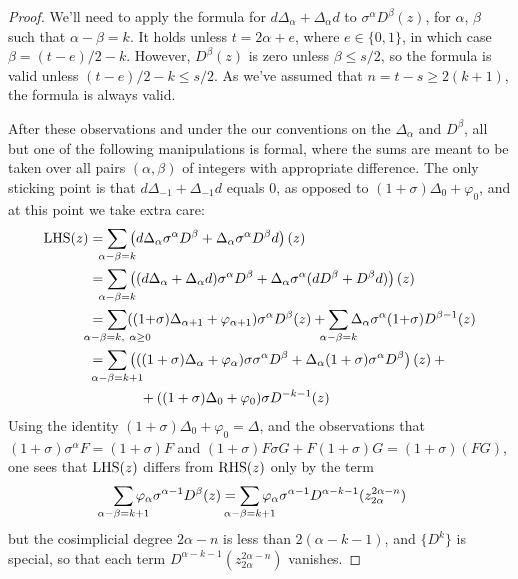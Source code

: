 \documentclass[11pt]{amsart}
\theoremstyle{plain}
\theoremstyle{definition}
\let\phi\varphi
\newcommand{\twist}{\sigma}
\theoremstyle{plain}
\begin{document}
\begin{proof}
\newcommand{\twolinesum}[2]{\mathop{\sum_{\mathclap{#1}}}_{\mathclap{#2}}}
\newcommand{\onelinesum}[1]{\sum_{\mathclap{#1}}}
We'll need to apply the formula for $d\Delta_\alpha+\Delta_\alpha d$ to $\twist^\alpha D^\beta(z)$, for $\alpha$, $\beta$ such that $\alpha-\beta=k$. %
It holds unless $t=2\alpha+e$, where $e\in\{0,1\}$, in which case $\beta=(t-e)/2-k$. However, $D^\beta(z)$ is zero unless $\beta\leq s/2$, so the formula is valid unless $(t-e)/2-k\leq s/2$. As we've assumed that $n=t-s\geq2(k+1)$, the formula is always valid.

After these observations and under the our conventions on the $\Delta_\alpha$ and $D^\beta$, all but one of the following manipulations is formal, where the sums are meant to be taken over all pairs $(\alpha,\beta)$ of integers with appropriate difference. The only sticking point is that $d\Delta_{-1}+\Delta_{-1}d$ equals $0$, as opposed to $(1{+}\twist)\Delta_0+\phi_0$, and at this point we take extra care:
%
\begin{alignat*}{2}
\textup{LHS}(z)
&=
\onelinesum{\alpha-\beta=k}\left(d\Delta_\alpha\twist^\alpha D^\beta+\Delta_\alpha\twist^\alpha D^\beta d\right)(z)%
\\
&=
\onelinesum{\alpha-\beta=k}\left((d\Delta_\alpha+
\Delta_\alpha d)\twist^\alpha D^\beta+
\Delta_\alpha\twist^\alpha (dD^\beta+
D^\beta d)\right)(z)%
\\
&=
\onelinesum{\alpha-\beta=k,\ \alpha\geq0}((1{+}\twist)\Delta_{\alpha+1}+\phi_{\alpha+1})\twist^\alpha D^\beta(z)+ \onelinesum{\alpha-\beta=k} \Delta_\alpha\twist^\alpha(1{+}\twist) D^{\beta-1}(z)%
\\
&=
\onelinesum{\alpha-\beta=k+1} \left(((1+\twist)\Delta_{\alpha}+ \phi_{\alpha})\twist\twist^{\alpha} D^\beta+\Delta_\alpha(1+\twist)\twist^\alpha D^{\beta}\right)(z) + {}%
\\
&\ \ \ \ \ \ \ \ \ \ \ +
((1+\twist)\Delta_{0}+\phi_{0})\twist D^{-k-1}(z)
\end{alignat*}
Using the identity $(1+\twist)\Delta_{0}+\phi_{0}=\Delta$, and the observations that $(1+\twist)\twist^\alpha F=(1+\twist)F$ and $(1+\twist)F\twist G+F(1+\twist)G=(1+\twist)(FG)$, one sees that $\textup{LHS}(z)$ differs from $\textup{RHS}(z)$ only by the term
\[\sum_{\mathclap{\alpha-\beta=k+1}} \phi_{\alpha}\sigma^{\alpha-1}D^{\beta}(z)=\sum_{\mathclap{\alpha-\beta=k+1}} \phi_{\alpha}\sigma^{\alpha-1}D^{\alpha-k-1}(z_{2\alpha}^{2\alpha-n})\]
but the cosimplicial degree $2\alpha-n$ is less than $2(\alpha-k-1)$, and $\{D^k\}$ is special, so that each term $D^{\alpha-k-1}(z_{2\alpha}^{2\alpha-n})$ vanishes.
\end{proof}
\end{document}
